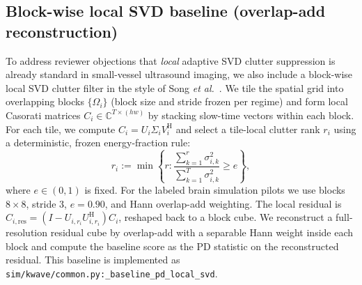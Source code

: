 \documentclass[11pt]{article}
\DeclareRobustCommand{\path}[1]{\nolinkurl{#1}}
\newcommand{\Hh}{^{\mathrm{H}}}
\begin{document}
\subsection{Block-wise local SVD baseline (overlap-add reconstruction)}
\label{app:baseline-local-svd}
To address reviewer objections that \emph{local} adaptive SVD clutter suppression is already standard in small-vessel ultrasound imaging, we also include a block-wise local SVD clutter filter in the style of Song \emph{et al.}\ \cite{SongBlockwiseLocal2017}. We tile the spatial grid into overlapping blocks $\{\Omega_i\}$ (block size and stride frozen per regime) and form local Casorati matrices $C_i\in\mathbb{C}^{T\times (h w)}$ by stacking slow-time vectors within each block. For each tile, we compute $C_i=U_i\Sigma_i V_i\Hh$ and select a tile-local clutter rank $r_i$ using a deterministic, frozen energy-fraction rule:
\[
  r_i := \min\left\{r:\frac{\sum_{k=1}^r \sigma_{i,k}^2}{\sum_{k=1}^{T}\sigma_{i,k}^2}\ge e\right\},
\]
where $e\in(0,1)$ is fixed. For the labeled brain simulation pilots we use blocks $8\times 8$, stride 3, $e=0.90$, and Hann overlap-add weighting. The local residual is $C_{i,\mathrm{res}}=(I-U_{i,r_i}U_{i,r_i}\Hh)C_i$, reshaped back to a block cube. We reconstruct a full-resolution residual cube by overlap-add with a separable Hann weight inside each block and compute the baseline score as the PD statistic on the reconstructed residual. This baseline is implemented as \path{sim/kwave/common.py:_baseline_pd_local_svd}.
\end{document}
